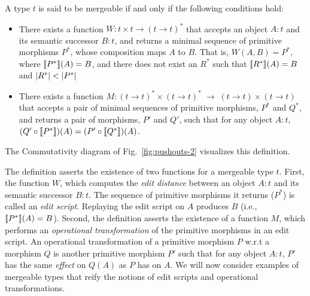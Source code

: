 \begin{definition} 
\label{def:mergeable-type-2}
A type $t$ is said to be mergeable if and only if the following
conditions hold:
\begin{itemize}
  \item There exists a function $W: t \times t \rightarrow (t
  \rightarrow t)^*$ that accepts an object $A:t$ and its
  semantic successor $B:t$, and returns a minimal sequence of
  primitive morphisms $P^*$, whose composition maps $A$ to $B$. That
  is, $W(A,B) = P^*$, where $\llbracket P^* \rrbracket(A) = B$, and there does not
  exist an $R^*$ such that $\llbracket R^* \rrbracket(A) = B$ and $\left|R^*\right| <
  \left|P^*\right|$

  \item There exists a function $M: (t \rightarrow t)^*\!\times\!(t
  \rightarrow t)^* \;\rightarrow\; (t \rightarrow t)\!\times\!(t
  \rightarrow t)$ that accepts a pair of minimal sequences of
  primitive morphisms, $P^*$ and $Q^*$, and returns a pair of morphisms,
  $P'$ and $Q'$, such that for any object $A:t$, $(Q' \circ
  \llbracket P^* \rrbracket)(A) = (P' \circ \llbracket Q^* \rrbracket)(A)$.  
\end{itemize}
The Commutativity diagram of Fig.~\ref{fig:pushouts-2} visualizes this
definition. 
\end{definition}

The definition asserts the existence of two functions for a mergeable
type $t$. First, the function $W$, which computes the \emph{edit
distance} between an object $A:t$ and its semantic successor $B:t$.
The sequence of primitive morphisms it returns ($P^*$) is called an
\emph{edit script}. Replaying the edit script on $A$ produces $B$
(i.e., $\llbracket P^* \rrbracket(A) = B$). Second, the definition asserts the
existence of a function $M$, which performs an \emph{operational
transformation} of the primitive morphisms in an edit script. An
operational transformation of a primitive morphism $P$ w.r.t a
morphism $Q$ is another primitive morphism $P'$ such that for any
object $A:t$, $P'$ has the same \emph{effect} on $Q(A)$ as $P$ has on
$A$. We will now consider examples of mergeable types that reify the
notions of edit scripts and operational transformations.



